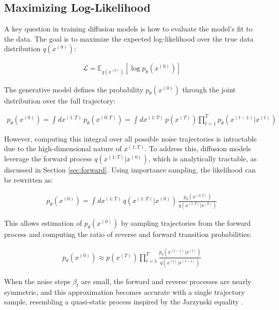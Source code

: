 \documentclass[12pt]{article}
\begin{document}
\subsection{Maximizing Log-Likelihood}
\label{subsec:log_likelihood}

A key question in training diffusion models is how to evaluate the model’s fit to the data. The goal is to maximize the expected log-likelihood over the true data distribution \( q(x^{(0)}) \):

\begin{align}
\mathcal{L} = \mathbb{E}_{q(x^{(0)})} \left[ \log p_\theta(x^{(0)}) \right]
\end{align}

The generative model defines the probability \( p_\theta(x^{(0)}) \) through the joint distribution over the full trajectory:

\begin{align}
p_\theta(x^{(0)}) = \int dx^{(1:T)} \, p_\theta(x^{(0:T)}) = \int dx^{(1:T)} \, p(x^{(T)}) \prod_{t=1}^{T} p_\theta(x^{(t-1)} | x^{(t)})
\end{align}

However, computing this integral over all possible noise trajectories is intractable due to the high-dimensional nature of \( x^{(1:T)} \). To address this, diffusion models leverage the forward process \( q(x^{(1:T)} | x^{(0)}) \), which is analytically tractable, as discussed in Section \ref{sec:forward}. Using importance sampling, the likelihood can be rewritten as:

\begin{align}
p_\theta(x^{(0)}) = \int dx^{(1:T)} \, q(x^{(1:T)} | x^{(0)}) \, \frac{p_\theta(x^{(0:T)})}{q(x^{(1:T)} | x^{(0)})}
\end{align}

This allows estimation of \( p_\theta(x^{(0)}) \) by sampling trajectories from the forward process and computing the ratio of reverse and forward transition probabilities:

\begin{align}
p_\theta(x^{(0)}) \approx p(x^{(T)}) \prod_{t=1}^{T} \frac{p_\theta(x^{(t-1)} | x^{(t)})}{q(x^{(t)} | x^{(t-1)})}
\end{align}

When the noise steps \( \beta_t \) are small, the forward and reverse processes are nearly symmetric, and this approximation becomes accurate with a single trajectory sample, resembling a quasi-static process inspired by the Jarzynski equality \cite{jarzynski1997}.
\end{document}
